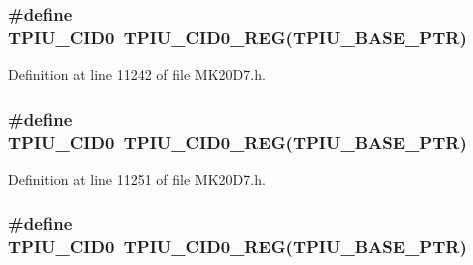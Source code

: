 \subsubsection[{\texorpdfstring{T\+P\+I\+U\+\_\+\+C\+I\+D0}{TPIU_CID0}}]{\setlength{\rightskip}{0pt plus 5cm}\#define T\+P\+I\+U\+\_\+\+C\+I\+D0~{\bf T\+P\+I\+U\+\_\+\+C\+I\+D0\+\_\+\+R\+EG}({\bf T\+P\+I\+U\+\_\+\+B\+A\+S\+E\+\_\+\+P\+TR})}\hypertarget{group___t_p_i_u___register___accessor___macros_gadebf3e786cb3a0be9090de57cc9971ad}{}\label{group___t_p_i_u___register___accessor___macros_gadebf3e786cb3a0be9090de57cc9971ad}


Definition at line 11242 of file M\+K20\+D7.\+h.

\subsubsection[{\texorpdfstring{T\+P\+I\+U\+\_\+\+C\+I\+D0}{TPIU_CID0}}]{\setlength{\rightskip}{0pt plus 5cm}\#define T\+P\+I\+U\+\_\+\+C\+I\+D0~{\bf T\+P\+I\+U\+\_\+\+C\+I\+D0\+\_\+\+R\+EG}({\bf T\+P\+I\+U\+\_\+\+B\+A\+S\+E\+\_\+\+P\+TR})}\hypertarget{group___t_p_i_u___register___accessor___macros_gadebf3e786cb3a0be9090de57cc9971ad}{}\label{group___t_p_i_u___register___accessor___macros_gadebf3e786cb3a0be9090de57cc9971ad}


Definition at line 11251 of file M\+K20\+D7.\+h.

\subsubsection[{\texorpdfstring{T\+P\+I\+U\+\_\+\+C\+I\+D0}{TPIU_CID0}}]{\setlength{\rightskip}{0pt plus 5cm}\#define T\+P\+I\+U\+\_\+\+C\+I\+D0~{\bf T\+P\+I\+U\+\_\+\+C\+I\+D0\+\_\+\+R\+EG}({\bf T\+P\+I\+U\+\_\+\+B\+A\+S\+E\+\_\+\+P\+TR})}\hypertarget{group___t_p_i_u___register___accessor___macros_gadebf3e786cb3a0be9090de57cc9971ad}{}\label{group___t_p_i_u___register___accessor___macros_gadebf3e786cb3a0be9090de57cc9971ad}


